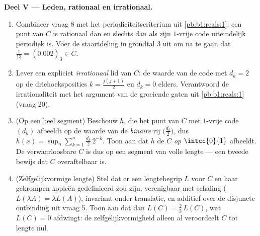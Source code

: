 \begin{problem}[{Weekendopgave --- de \omterm{pb:b1:topology:1}{Cantorverzameling} van de middelste
derden: lengte nul, overaftelbaar, perfect, en $C + C = \intcc{0}{2}$}]
\medskip
\noindent\textbf{Deel V --- Leden, rationaal en irrationaal.}
\begin{enumerate}[resume]
  \item Combineer vraag 8 met het periodiciteitscriterium uit
        \cref{pb:b1:reals:1}: een punt van $C$ is rationaal dan en
        slechts dan als zijn $1$-vrije code uiteindelijk periodiek is.
        Voer de staartdeling in grondtal $3$ uit om na te gaan dat
        $\frac1{13} = (0.\overline{002})_3 \in C$.
  \item Lever een expliciet \emph{irrationaal} lid van $C$: de waarde
        van de code met $d_k = 2$ op de driehoeksposities $k =
        \frac{j(j+1)}{2}$ en $d_k = 0$ elders. Verantwoord de
        irrationaliteit met het argument van de groeiende gaten uit
        \cref{pb:b1:reals:1} (vraag 20).
  \item (Op een heel segment) Beschouw $h$, die het punt van $C$ met
        $1$-vrije code $(d_k)$ afbeeldt op de waarde van de
        \emph{binaire} rij $\bigl(\frac{d_k}2\bigr)$, dus $h(x) = \sup_n
        \sum_{k=1}^n \frac{d_k}{2}\,2^{-k}$. Toon aan dat $h$ de
         $C$ \emph{op} $\intcc{0}{1}$ afbeeldt. De
        verwaarloosbare $C$ is dus  op een segment van volle
        lengte --- een tweede bewijs dat $C$ overaftelbaar is.
  \item (Zelfgelijkvormige lengte) Stel dat er een lengtebegrip $L$ voor
        $C$ en haar gekrompen kopieën gedefinieerd zou zijn, verenigbaar
        met schaling ($L(\lambda A) = \lambda L(A)$), invariant onder
        translatie, en additief over de disjuncte ontbinding uit vraag
        5. Toon aan dat dan $L(C) = \frac23\,L(C)$, wat $L(C) = 0$
        afdwingt: de zelfgelijkvormigheid alleen al veroordeelt $C$ tot
        lengte nul.
\end{enumerate}


\end{problem}
